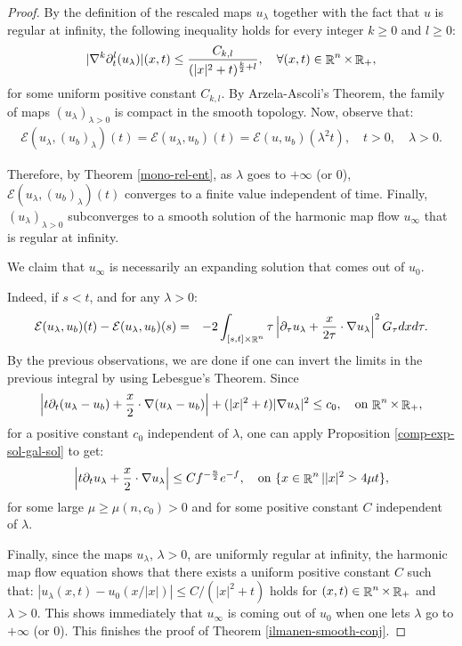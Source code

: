 \documentclass[a4paper,11pt,reqno]{amsart}
\def\R{\mathop{\rm \mathbb{R}}\nolimits}
\begin{document}
\begin{proof}
By the definition of the rescaled maps $u_{\lambda}$ together with the fact that $u$ is regular at infinity, the following inequality holds for every integer $k\geq 0$ and $l\geq0$:
\begin{eqnarray*}
|\nabla^k\partial_t^l( u_{\lambda})|(x,t)\leq\frac{C_{k,l}}{(|x|^2+t)^{\frac{k}{2}+l}},\quad\forall (x,t)\in\R^n\times\R_+,
\end{eqnarray*}
for some uniform positive constant $C_{k,l}$.
By Arzela-Ascoli's Theorem, the family of maps $(u_{\lambda})_{\lambda>0}$ is compact in the smooth topology. Now, observe that:
\begin{eqnarray*}
\mathcal{E}(u_{\lambda},(u_b)_{\lambda})(t)=\mathcal{E}(u_{\lambda},u_b)(t)=\mathcal{E}(u,u_b)(\lambda^2t), \quad t>0,\quad \lambda >0.
\end{eqnarray*}

Therefore, by Theorem \ref{mono-rel-ent}, as $\lambda$ goes to $+\infty$ (or $0$),  $\mathcal{E}(u_{\lambda},(u_b)_{\lambda})(t)$ converges to a finite value independent of time. Finally, $(u_{\lambda})_{\lambda>0}$ subconverges to a smooth solution of the harmonic map flow $u_{\infty}$ that is regular at infinity. 


 We claim that $u_{\infty}$ is necessarily an expanding solution that comes out of $u_0$. 

Indeed, if $s<t$, and for any $\lambda >0$:
\begin{eqnarray*}
\mathcal{E}(u_{\lambda},u_b)(t)-\mathcal{E}(u_{\lambda},u_b)(s)&=&-2\int_{[s,t]\times\R^n}\tau\left|\partial_{\tau}u_{\lambda}+\frac{x}{2\tau}\cdot\nabla u_{\lambda}\right|^2G_{\tau}dxd\tau.
\end{eqnarray*}
By the previous observations, we are done if one can invert the limits in the previous integral by using Lebesgue's Theorem. Since 
\begin{eqnarray*}
\left|t\partial_t(u_{\lambda}-u_b)+\frac{x}{2}\cdot\nabla (u_{\lambda}-u_b)\right|+(|x|^2+t)|\nabla u_{\lambda}|^2\leq c_0,\quad \text{on $\R^n\times\R_+$},
\end{eqnarray*}
 for a positive constant $c_0$ independent of $\lambda$, one can apply Proposition \ref{comp-exp-sol-gal-sol} to get:
\begin{eqnarray*}
\left|t \partial_{t}u_{\lambda}+\frac{x}{2}\cdot\nabla u_{\lambda}\right|\leq Cf^{-\frac{n}{2}}e^{-f},\quad \text{on $\{x\in\R^n||x|^2>4\mu t\}$},
\end{eqnarray*}
for some large $\mu\geq \mu(n,c_0)>0$ and for some positive constant $C$ independent of $\lambda$.

Finally, since the maps $u_{\lambda}$, $\lambda>0$, are uniformly regular at infinity, the harmonic map flow equation shows that there exists a uniform positive constant $C$ such that: $|u_{\lambda}(x,t)-u_0(x/|x|)|\leq C/(|x|^2+t)$ holds for $(x,t)\in\R^n\times\R_+$ and $\lambda>0$. This shows immediately that $u_{\infty}$ is coming out of $u_0$ when one lets $\lambda$ go to $+\infty$ (or $0$). This finishes the proof of Theorem \ref{ilmanen-smooth-conj}.
\end{proof}
\end{document}
